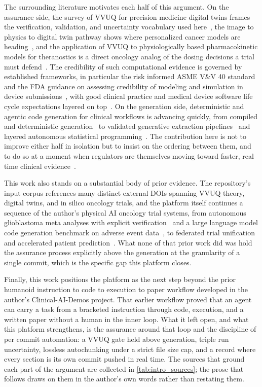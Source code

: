 The surrounding literature motivates each half of this argument. On the assurance
side, the survey of VVUQ for precision medicine digital twins frames the
verification, validation, and uncertainty vocabulary used here~\cite{sel2025vvuq},
the image to physics to digital twin pathway shows where personalized cancer
models are heading~\cite{moradi2026twins}, and the application of VVUQ to
physiologically based pharmacokinetic models for theranostics is a direct oncology
analog of the dosing decisions a trial must defend~\cite{zaid2025pbpk}. The
credibility of such computational evidence is governed by established frameworks,
in particular the risk informed ASME V\&V 40 standard and the FDA guidance on
assessing credibility of modeling and simulation in device
submissions~\cite{asmevv40, fda2023credibility}, with good clinical practice and
medical device software life cycle expectations layered on
top~\cite{iche6r3, iec62304}. On the generation side, deterministic and agentic
code generation for clinical workflows is advancing quickly, from compiled and
deterministic generation~\cite{trooskens2026compiled} to validated generative
extraction pipelines~\cite{carlisle2026pipeline} and layered autonomous
statistical programming~\cite{yan2026clinagent}. The contribution here is not to
improve either half in isolation but to insist on the ordering between them, and
to do so at a moment when regulators are themselves moving toward faster, real
time clinical evidence~\cite{fda2026realtime}.

This work also stands on a substantial body of prior evidence. The repository's
input corpus references many distinct external DOIs spanning VVUQ theory, digital
twins, and in silico oncology trials, and the platform itself continues a
sequence of the author's physical AI oncology trial systems, from autonomous
glioblastoma meta analyses with explicit verification~\cite{kawchak2025glioblastoma}
and a large language model code generation benchmark on adverse event
data~\cite{kawchak2025faers}, to federated trial unification~\cite{kawchak2026federated}
and accelerated patient prediction~\cite{kawchak2026prediction}. What none of that
prior work did was hold the assurance process explicitly above the generation at
the granularity of a single commit, which is the specific gap this platform
closes.

Finally, this work positions the platform as the next step beyond the prior
humanoid instruction to code to execution to paper workflow developed in the
author's Clinical-AI-Demos project. That earlier workflow proved that an agent
can carry a task from a bracketed instruction through code, execution, and a
written paper without a human in the inner loop. What it left open, and what this
platform strengthens, is the assurance around that loop and the discipline of
per commit automation: a VVUQ gate held above generation, triple run
uncertainty, lossless autochunking under a strict file size cap, and a record
where every section is its own commit pushed in real time. The sources that
ground each part of the argument are collected in \autoref{tab:intro_sources};
the prose that follows draws on them in the author's own words rather than
restating them.

